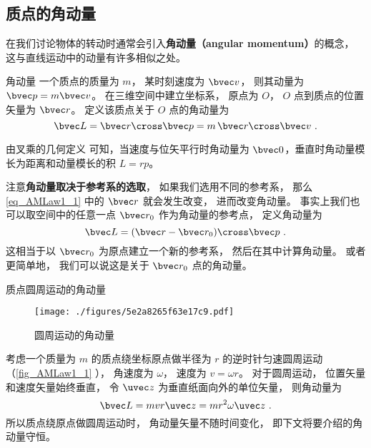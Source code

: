 

\subsection{质点的角动量}
在我们讨论物体的转动时通常会引入\textbf{角动量（angular momentum）}的概念， 这与直线运动中的动量有许多相似之处。

\begin{definition}{角动量}
一个质点的质量为 $m$， 某时刻速度为 $\bvec v$， 则其动量为 $\bvec p = m\bvec v$。 在三维空间中建立坐标系， 原点为 $O$， $O$ 点到质点的位置矢量为 $\bvec r$。 定义该质点关于 $O$ 点的角动量为
\begin{equation}\label{eq_AMLaw1_1}
\bvec L = \bvec r \cross \bvec p = m \,\bvec r\cross \bvec v~.
\end{equation}
\end{definition}

由叉乘的几何定义 可知，当速度与位矢平行时角动量为 $\bvec 0$，垂直时角动量模长为距离和动量模长的积 $L = rp$。

注意\textbf{角动量取决于参考系的选取}， 如果我们选用不同的参考系， 那么\autoref{eq_AMLaw1_1} 中的 $\bvec r$ 就会发生改变， 进而改变角动量。 事实上我们也可以取空间中的任意一点 $\bvec r_0$ 作为角动量的参考点， 定义角动量为
\begin{equation}
\bvec L = (\bvec r - \bvec r_0) \cross \bvec p~.
\end{equation}
这相当于以 $\bvec r_0$ 为原点建立一个新的参考系， 然后在其中计算角动量。 或者更简单地， 我们可以说这是关于 $\bvec r_0$ 点的角动量。

\begin{example}{质点圆周运动的角动量}\label{ex_AMLaw1_2}
\begin{figure}[ht]
\centering
\texttt{[image: ./figures/5e2a8265f63e17c9.pdf]}
\caption{圆周运动的角动量} \label{fig_AMLaw1_1}
\end{figure}
考虑一个质量为 $m$ 的质点绕坐标原点做半径为 $r$ 的逆时针匀速圆周运动（\autoref{fig_AMLaw1_1} ）， 角速度为 $\omega$， 速度为 $v = \omega r$。 对于圆周运动， 位置矢量和速度矢量始终垂直， 令 $\uvec z$ 为垂直纸面向外的单位矢量， 则角动量为
\begin{equation}
\bvec L = mvr \uvec z = m r^2 \omega \uvec z~.
\end{equation}
所以质点绕原点做圆周运动时， 角动量矢量不随时间变化， 即下文将要介绍的角动量守恒。
\end{example}


